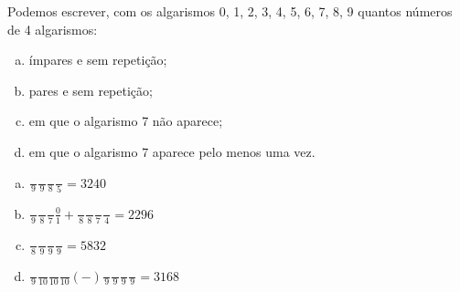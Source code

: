 \begin{ex}
 Podemos escrever, com os algarismos 0, 1, 2, 3, 4, 5, 6, 7, 8, 9 quantos números de 4 algarismos:
    \begin{enumerate}[(a)]
    \item ímpares e sem repetição;
    \item pares e sem repetição; 
    \item em que o algarismo 7 não aparece;
    \item em que o algarismo 7 aparece pelo menos uma vez.
    \end{enumerate}
      \begin{sol}
       \phantom{A}
        \begin{enumerate} [(a)]
            \item $\frac{\phantom{A}}{9}\frac{\phantom{A}}{9}\frac{\phantom{A}}{8}\frac{\phantom{A}}{5}=3240$
            \item $\frac{\phantom{A}}{9}\frac{\phantom{A}}{8}\frac{\phantom{A}}{7}\frac{0}{1}+\frac{\phantom{A}}{8}\frac{\phantom{A}}{8}\frac{\phantom{A}}{7}\frac{\phantom{A}}{4}=2296$
            \item $\frac{\phantom{A}}{8}\frac{\phantom{A}}{9}\frac{\phantom{A}}{9}\frac{\phantom{A}}{9}=5832$
            \item $\frac{\phantom{A}}{9}\frac{\phantom{A}}{10}\frac{\phantom{A}}{10}\frac{\phantom{A}}{10} (-) \frac{\phantom{A}}{9}\frac{\phantom{A}}{9}\frac{\phantom{A}}{9}\frac{\phantom{A}}{9}=3168$
        \end{enumerate}
      \end{sol}
\end{ex}
